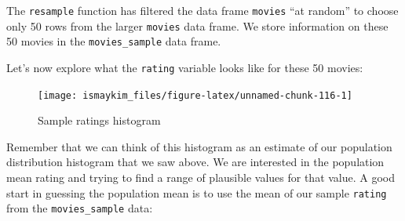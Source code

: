 \documentclass[]{tufte-book}
\newenvironment{Shaded}{\begin{snugshade}}{\end{snugshade}}
\newcommand{\KeywordTok}[1]{\textcolor[rgb]{0.13,0.29,0.53}{\textbf{{#1}}}}
\newcommand{\DataTypeTok}[1]{\textcolor[rgb]{0.13,0.29,0.53}{{#1}}}
\newcommand{\DecValTok}[1]{\textcolor[rgb]{0.00,0.00,0.81}{{#1}}}
\newcommand{\StringTok}[1]{\textcolor[rgb]{0.31,0.60,0.02}{{#1}}}
\newcommand{\OtherTok}[1]{\textcolor[rgb]{0.56,0.35,0.01}{{#1}}}
\newcommand{\NormalTok}[1]{{#1}}
\theoremstyle{definition}
\theoremstyle{definition}
\theoremstyle{remark}
\begin{document}
\begin{Shaded}
\end{Shaded}

The \texttt{resample} function has filtered the data frame
\texttt{movies} ``at random'' to choose only 50 rows from the larger
\texttt{movies} data frame. We store information on these 50 movies in
the \texttt{movies\_sample} data frame.

Let's now explore what the \texttt{rating} variable looks like for these
50 movies:

\begin{Shaded}
\end{Shaded}

\begin{figure}

{\centering \texttt{[image: ismaykim\_files/figure-latex/unnamed-chunk-116-1]} 

}

\caption[Sample ratings histogram]{Sample ratings histogram}\label{fig:unnamed-chunk-116}
\end{figure}

Remember that we can think of this histogram as an estimate of our
population distribution histogram that we saw above. We are interested
in the population mean rating and trying to find a range of plausible
values for that value. A good start in guessing the population mean is
to use the mean of our sample \texttt{rating} from the
\texttt{movies\_sample} data:

\begin{Shaded}
\end{Shaded}
\end{document}
